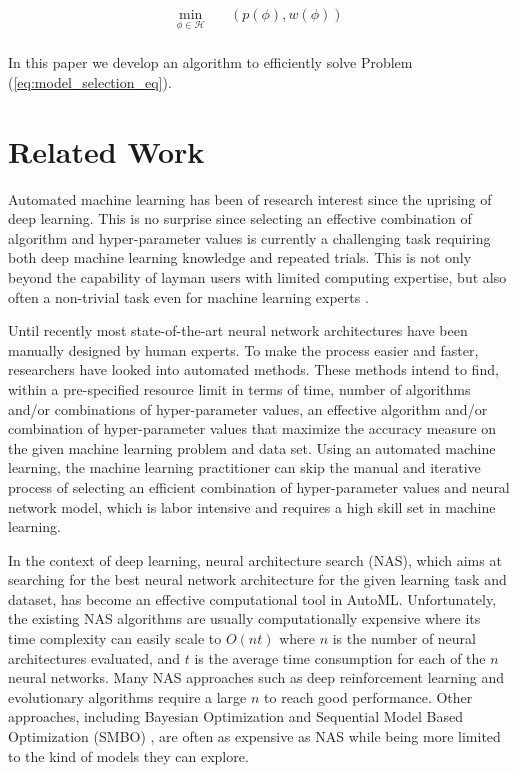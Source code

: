 \documentclass[preprint,12pt]{elsarticle}%
\begin{document}
\begin{equation}
	\begin{aligned}
	\underset{\phi \in \mathcal{H}}{\text{min}}
	& \quad (p(\phi), w(\phi))\\
	\end{aligned}
	\label{eq:model_selection_eq}
\end{equation}

In this paper we develop an algorithm to efficiently solve Problem (\ref{eq:model_selection_eq}).


\section{Related Work}
\label{sec:literature_review}

Automated machine learning has been of research interest since the uprising of deep learning. This is no surprise since selecting an effective combination of algorithm and hyper-parameter values is currently a challenging task requiring both deep machine learning knowledge and repeated trials. This is not only beyond the capability of layman users with limited computing expertise, but also often a non-trivial task even for machine learning experts \cite{sparks2015}. 

Until recently most state-of-the-art neural network architectures have been manually designed by human experts. To make the process easier and faster, researchers have looked into automated methods. These methods intend to find, within a pre-specified resource limit in terms of time, number of algorithms and/or combinations of hyper-parameter values, an effective algorithm and/or combination of hyper-parameter values that maximize the accuracy measure on the given machine learning problem and data set. Using an automated machine learning, the machine learning practitioner can skip the manual and iterative process of selecting an efficient combination of hyper-parameter values and neural network model, which is labor intensive and requires a high skill set in machine learning.

In the context of deep learning, neural architecture search (NAS), which aims at searching for the best neural network architecture for the given learning task and dataset, has become an effective computational tool in AutoML. Unfortunately, the existing NAS algorithms are usually computationally expensive where its time complexity can easily scale to $O(nt)$ where $n$ is the number of neural architectures evaluated, and $t$ is the average time consumption for each of the $n$ neural networks. Many NAS approaches such as deep reinforcement learning  \cite{Zoph2016,Baker2016,Zhong2017} and evolutionary algorithms \cite{Liu2018,Liang2017,Angeline1994,Suganuma2017} require a large $n$ to reach good performance. Other approaches, including Bayesian Optimization \cite{Thornton2016,Brochu2010} and Sequential Model Based Optimization (SMBO) \cite{Hutter2011,Feurer2015}, are often as expensive as NAS while being more limited to the kind of models they can explore.
\end{document}
